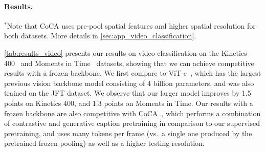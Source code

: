 \paragraph{Results.}
\begin{table}[t]
    \caption{
        Video classification results.
        We evaluate the \chonk representations by freezing the backbone, and training a small transformer to aggregate frozen, per-frame representations.
        \chonk outperforms the largest previous vision backbone, ViT-e~\citep{chen2022pali} which contains 4 billion parameters and is also pretrained on JFT.
    }
    \begin{adjustwidth}{110pt}{110pt}
    \begin{spacing}{0.125}{\fontsize{8pt}{5pt}\selectfont $^*$Note that CoCA uses pre-pool spatial features and higher spatial resolution for both datasets. More details in \cref{sec:app_video_classification}.}\end{spacing}
    \end{adjustwidth}
    \label{tab:results_video}
\end{table}
\cref{tab:results_video} presents our results on video classification on the Kinetics 400~\citep{kay2017kinetics} and Moments in Time~\citep{monfort2019moments} datasets, showing that we can achieve competitive results with a frozen backbone.
We first compare to ViT-e~\citep{chen2022pali}, which has the largest previous vision backbone model consisting of 4 billion parameters, and was also trained on the JFT dataset.
We observe that our larger \chonk model improves by 1.5 points on Kinetics 400, and 1.3 points on Moments in Time. 
Our results with a frozen backbone are also competitive with CoCA~\citep{yu2022coca}, which performs a combination of contrastive and generative caption pretraining in comparison to our supervised pretraining, and uses many tokens per frame (vs.\ a single one produced by the pretrained frozen pooling) as well as a higher testing resolution.

